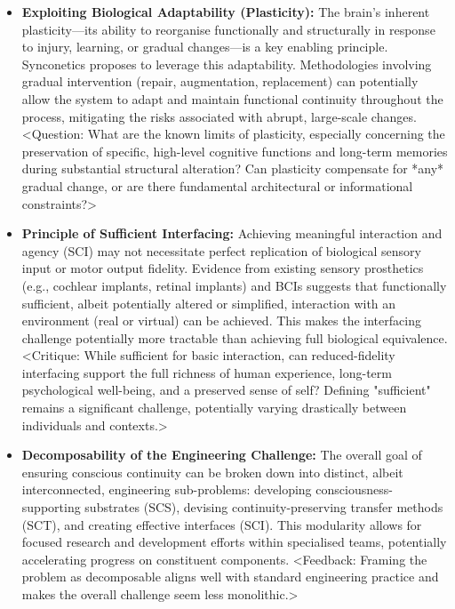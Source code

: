 \documentclass[10pt]{article}
\begin{document}
\begin{sloppypar}
\begin{itemize}
    \item \textbf{Exploiting Biological Adaptability (Plasticity):} The brain's inherent plasticity—its ability to reorganise functionally and structurally in response to injury, learning, or gradual changes—is a key enabling principle. Synconetics proposes to leverage this adaptability. Methodologies involving gradual intervention (repair, augmentation, replacement) can potentially allow the system to adapt and maintain functional continuity throughout the process, mitigating the risks associated with abrupt, large-scale changes. <Question: What are the known limits of plasticity, especially concerning the preservation of specific, high-level cognitive functions and long-term memories during substantial structural alteration? Can plasticity compensate for *any* gradual change, or are there fundamental architectural or informational constraints?>

    \item \textbf{Principle of Sufficient Interfacing:} Achieving meaningful interaction and agency (SCI) may not necessitate perfect replication of biological sensory input or motor output fidelity. Evidence from existing sensory prosthetics (e.g., cochlear implants, retinal implants) and BCIs suggests that functionally sufficient, albeit potentially altered or simplified, interaction with an environment (real or virtual) can be achieved. This makes the interfacing challenge potentially more tractable than achieving full biological equivalence. <Critique: While sufficient for basic interaction, can reduced-fidelity interfacing support the full richness of human experience, long-term psychological well-being, and a preserved sense of self? Defining "sufficient" remains a significant challenge, potentially varying drastically between individuals and contexts.>

    \item \textbf{Decomposability of the Engineering Challenge:} The overall goal of ensuring conscious continuity can be broken down into distinct, albeit interconnected, engineering sub-problems: developing consciousness-supporting substrates (SCS), devising continuity-preserving transfer methods (SCT), and creating effective interfaces (SCI). This modularity allows for focused research and development efforts within specialised teams, potentially accelerating progress on constituent components. <Feedback: Framing the problem as decomposable aligns well with standard engineering practice and makes the overall challenge seem less monolithic.>


\end{itemize}
\end{sloppypar}
\end{document}
